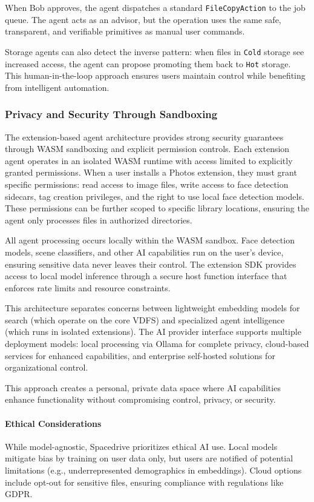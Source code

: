 \documentclass[sigconf]{acmart}
\begin{document}
When Bob approves, the agent dispatches a standard \texttt{FileCopyAction} to the job queue. The agent acts as an advisor, but the operation uses the same safe, transparent, and verifiable primitives as manual user commands.

Storage agents can also detect the inverse pattern: when files in \texttt{Cold} storage see increased access, the agent can propose promoting them back to \texttt{Hot} storage. This human-in-the-loop approach ensures users maintain control while benefiting from intelligent automation.

\subsubsection{Privacy and Security Through Sandboxing}

The extension-based agent architecture provides strong security guarantees through WASM sandboxing and explicit permission controls. Each extension agent operates in an isolated WASM runtime with access limited to explicitly granted permissions. When a user installs a Photos extension, they must grant specific permissions: read access to image files, write access to face detection sidecars, tag creation privileges, and the right to use local face detection models. These permissions can be further scoped to specific library locations, ensuring the agent only processes files in authorized directories.

All agent processing occurs locally within the WASM sandbox. Face detection models, scene classifiers, and other AI capabilities run on the user's device, ensuring sensitive data never leaves their control. The extension SDK provides access to local model inference through a secure host function interface that enforces rate limits and resource constraints.

This architecture separates concerns between lightweight embedding models for search (which operate on the core VDFS) and specialized agent intelligence (which runs in isolated extensions). The AI provider interface supports multiple deployment models: local processing via Ollama for complete privacy, cloud-based services for enhanced capabilities, and enterprise self-hosted solutions for organizational control.

This approach creates a personal, private data space where AI capabilities enhance functionality without compromising control, privacy, or security.

\paragraph{Ethical Considerations}
While model-agnostic, Spacedrive prioritizes ethical AI use. Local models mitigate bias by training on user data only, but users are notified of potential limitations (e.g., underrepresented demographics in embeddings). Cloud options include opt-out for sensitive files, ensuring compliance with regulations like GDPR.
\end{document}
